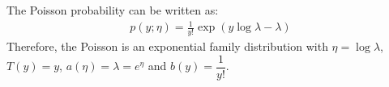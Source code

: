 \begin{answer}
The Poisson probability can be written as:
\begin{align}
	p(y; \eta) = \frac{1}{y!} \exp(y \log\lambda - \lambda)
\end{align}
Therefore, the Poisson is an exponential family distribution with $\eta = \log \lambda$, $T(y) = y$, $a(\eta) = \lambda = e^{\eta}$ and $b(y) = \dfrac{1}{y!}$. \\
\end{answer}
